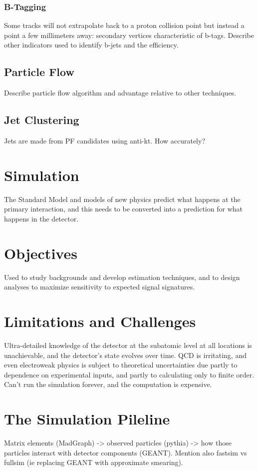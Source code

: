     \subsubsection{B-Tagging} \label{sec:btagging}

    Some tracks will not extrapolate back to a proton collision point but instead a point a few millimeters away: secondary vertices characteristic of b-tags.
    Describe other indicators used to identify b-jets and the efficiency.

  \subsection{Particle Flow} \label{sec:particleflow}

  Describe particle flow algorithm and advantage relative to other techniques.

  \subsection{Jet Clustering} \label{sec:jetclustering}

  Jets are made from PF candidates using anti-kt.
  How accurately?

\section{Simulation} \label{sec:simulation}

  The Standard Model and models of new physics predict what happens at the primary interaction, and this needs to be converted into a prediction for what happens in the detector.

  \section{Objectives} \label{sec:objectives}

  Used to study backgrounds and develop estimation techniques, and to design analyses to maximize sensitivity to expected signal signatures.

  \section{Limitations and Challenges} \label{sec:limitations}

  Ultra-detailed knowledge of the detector at the subatomic level at all locations is unachievable, and the detector's state evolves over time.
  QCD is irritating, and even electroweak physics is subject to theoretical uncertainties due partly to dependence on experimental inputs, and partly to calculating only to finite order.
  Can't run the simulation forever, and the computation is expensive.

  \section{The Simulation Pileline} \label{sec:pipeline}

  Matrix elements (MadGraph) -> observed particles (pythia) -> how those particles interact with detector components (GEANT).
  Mention also fastsim vs fullsim (ie replacing GEANT with approximate smearing).
